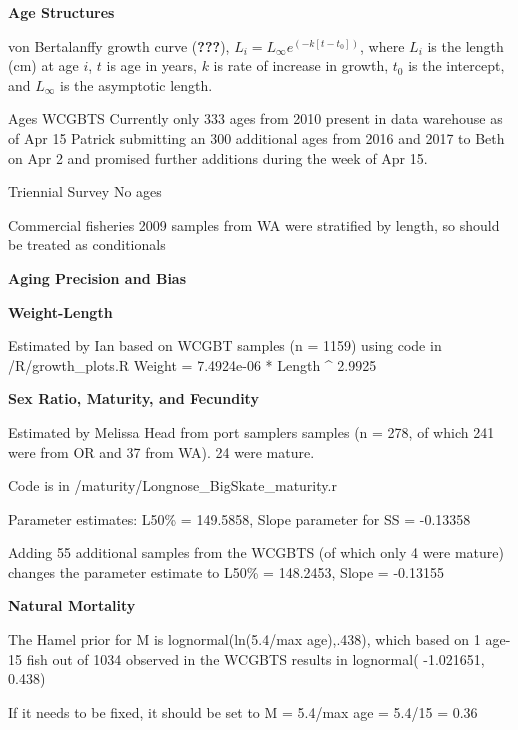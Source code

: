 \documentclass[12pt,]{article}
\begin{document}
\textbf{Age Structures}

von Bertalanffy growth curve ({\textbf{???}}),
\(L_i = L_{\infty}e^{(-k[t-t_0])}\), where \(L_i\) is the length (cm) at
age \(i\), \(t\) is age in years, \(k\) is rate of increase in growth,
\(t_0\) is the intercept, and \(L_{\infty}\) is the asymptotic length.

Ages WCGBTS Currently only 333 ages from 2010 present in data warehouse
as of Apr 15 Patrick submitting an 300 additional ages from 2016 and
2017 to Beth on Apr 2 and promised further additions during the week of
Apr 15.

Triennial Survey No ages

Commercial fisheries 2009 samples from WA were stratified by length, so
should be treated as conditionals

\vspace{.5cm}

\textbf{Aging Precision and Bias}

\vspace{.5cm}

\textbf{Weight-Length}

Estimated by Ian based on WCGBT samples (n = 1159) using code in
/R/growth\_plots.R Weight = 7.4924e-06 * Length \^{} 2.9925

\vspace{.5cm}

\textbf{Sex Ratio, Maturity, and Fecundity}

Estimated by Melissa Head from port samplers samples (n = 278, of which
241 were from OR and 37 from WA). 24 were mature.

Code is in /maturity/Longnose\_BigSkate\_maturity.r

Parameter estimates: L50\% = 149.5858, Slope parameter for SS = -0.13358

Adding 55 additional samples from the WCGBTS (of which only 4 were
mature) changes the parameter estimate to L50\% = 148.2453, Slope =
-0.13155

\vspace{.5cm}

\textbf{Natural Mortality}

The Hamel prior for M is lognormal(ln(5.4/max age),.438), which based on
1 age-15 fish out of 1034 observed in the WCGBTS results in lognormal(
-1.021651, 0.438)

If it needs to be fixed, it should be set to M = 5.4/max age = 5.4/15 =
0.36

\vspace{.5cm}
\end{document}
